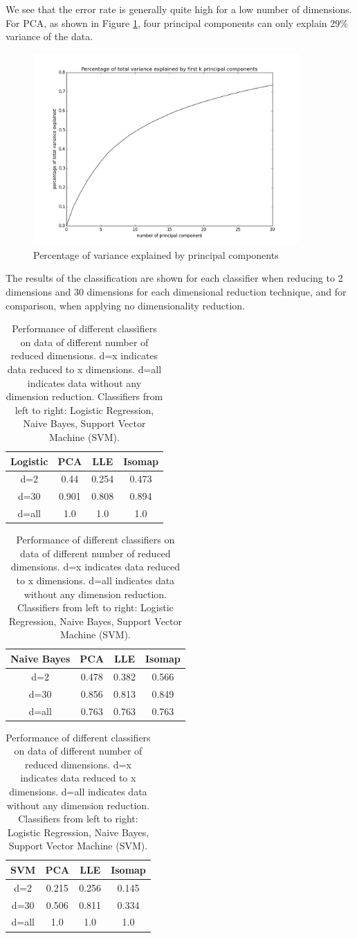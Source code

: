 \documentclass[11pt]{article}
\begin{document}
We see that the error rate is generally quite high for a low number of dimensions. For PCA, as shown in Figure \ref{pca-variance-explained}, four principal components can only explain 29\% variance of the data.

\begin{figure}[H]
\centering
\includegraphics[width=4in]{pca_explained.png}
\caption{Percentage of variance explained by principal components}
\label{pca-variance-explained}
\end{figure}

The results of the classification are shown for each classifier when reducing to 2 dimensions and 30 dimensions for each dimensional reduction technique, and for comparison, when applying no dimensionality reduction.

\begin{table}[H]
\begin{center}
\begin{tabular}{|c|c|c|c|}\hline
Logistic & PCA & LLE & Isomap\\\hline
d=2 & 0.44 & 0.254 & 0.473\\\hline
d=30 & 0.901 & 0.808 & 0.894\\\hline
d=all & 1.0 & 1.0 & 1.0\\\hline
\end{tabular}
\begin{tabular}{|c|c|c|c|}\hline
Naive Bayes & PCA & LLE & Isomap\\\hline
d=2 & 0.478 & 0.382 & 0.566\\\hline
d=30 & 0.856 & 0.813 & 0.849\\\hline
d=all & 0.763 & 0.763 & 0.763\\\hline
\end{tabular}
\begin{tabular}{|c|c|c|c|}\hline
SVM & PCA & LLE & Isomap\\\hline
d=2 & 0.215 & 0.256 & 0.145\\\hline
d=30 & 0.506 & 0.811 & 0.334\\\hline
d=all & 1.0 & 1.0 & 1.0\\\hline
\end{tabular}
\end{center}
\caption{Performance of different classifiers on data of different number of reduced dimensions. d=x indicates data reduced to x dimensions. d=all indicates data without any dimension reduction. Classifiers from left to right: Logistic Regression, Naive Bayes, Support Vector Machine (SVM).}
\end{table}
\end{document}
